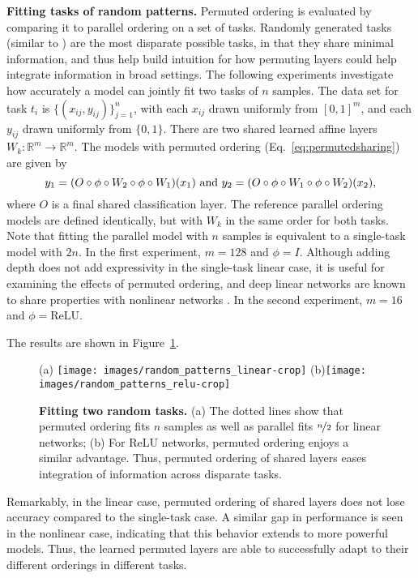 \documentclass{article}
\theoremstyle{definition}
\theoremstyle{remark}
\begin{document}
\textbf{Fitting tasks of random patterns. }
Permuted ordering is evaluated by comparing it to parallel ordering on a set of tasks.
Randomly generated tasks (similar to \citep{Kirkpatrick:2017}) are the most disparate possible tasks, in that they share minimal information, and thus help build intuition for how permuting layers could help integrate information in broad settings.
The following experiments investigate how accurately a model can jointly fit two tasks of $n$ samples. The data set for task $t_i$ is $\{(x_{ij}, y_{ij})\}_{j=1}^n$, with each $x_{ij}$ drawn uniformly from $[0,1]^m$, and each $y_{ij}$ drawn uniformly from $\{0,1\}$. 
There are two shared learned affine layers $W_k:\mathbb{R}^m \rightarrow \mathbb{R}^m$.
The models with permuted ordering (Eq.~\ref{eq:permutedsharing}) are given by
\begin{equation} \label{eq:randomtasks}
y_1 = (O \circ \phi \circ W_2 \circ \phi \circ W_1)(x_1) \text{ and } \\ y_2 = (O \circ \phi \circ W_1 \circ \phi \circ W_2)(x_2),
\end{equation}
where $O$ is a final shared classification layer.
The reference parallel ordering models are defined identically, but with $W_k$ in the same order for both tasks.
Note that fitting the parallel model with $n$ samples is equivalent to a single-task model with $2n$.
In the first experiment, $m = 128$ and $\phi = I$. 
Although adding depth does not add expressivity in the single-task linear case, it is useful for examining the effects of permuted ordering, and deep linear networks are known to share properties with nonlinear networks \citep{Saxe:2013}.
In the second experiment, $m = 16$ and $\phi = \text{ReLU}.$

The results are shown in Figure~\ref{fig:random_patterns}.
\begin{figure}
(a) 
\texttt{[image: images/random\_patterns\_linear-crop]}
\hspace{5pt}
(b)\texttt{[image: images/random\_patterns\_relu-crop]}
\caption{\textbf{Fitting two random tasks.} 
(a) The dotted lines show that permuted ordering fits $n$ samples as well as parallel fits $\nicefrac{n}{2}$ for linear networks; 
(b) For ReLU networks, permuted ordering enjoys a similar advantage.
Thus, permuted ordering of shared layers eases integration of information across disparate tasks.
}
\label{fig:random_patterns}
\end{figure}
Remarkably, in the linear case, permuted ordering of shared layers does not lose accuracy compared to the single-task case.
A similar gap in performance is seen in the nonlinear case, indicating that this behavior extends to more powerful models.
Thus, the learned permuted layers are able to successfully adapt to their different orderings in different tasks.
\end{document}
